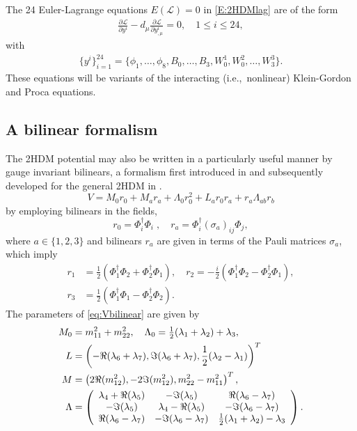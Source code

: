 \documentclass[a4paper,hidelinks, 12pt]{article}
\numberwithin{equation}{section}
\theoremstyle{plain}
\newcommand{\nn}{\nonumber}
\newcommand{\mc}{\mathcal}
\begin{document}
The 24 Euler-Lagrange equations $E(\mc{L})=0$ in \eqref{E:2HDMlag}
are of the form
\begin{align}\label{E:EL2HDM}
	\frac{\partial \mc{L}}{\partial y^i}-d_\mu \frac{\partial \mc{L}}{\partial y^i_{,\mu}}=0, \quad 1\leq i \leq 24,
\end{align}
with 
\begin{align}\label{E:24fields}
	\{y^i\}_{i=1}^{24}=\{\phi_1,\ldots, \phi_8,B_0,\ldots,B_3, W_0^1,W_0^2,\ldots,W_3^3\}.
\end{align}
These equations will be variants of the interacting (i.e.,~nonlinear) Klein-Gordon and Proca equations.

\subsection{A bilinear formalism}
\label{sec:ABilinearFormalism}
The 2HDM potential may also be written in a particularly useful manner by gauge invariant bilinears, a formalism first introduced in \cite{Nagel:2004sw} and subsequently
developed for the general 2HDM in \cite{Maniatis:2007vn}.
\begin{equation}
\label{eq:Vbilinear}
V = M_0r_0 + M_a r_a + \Lambda_0 r_0^2 + L_a r_0r_a + r_a \Lambda_{ab} r_b
\end{equation}
by employing bilinears in the fields,
\begin{equation}\label{E:bilinears}
r_0 = \Phi_i^\dag \Phi_i \;, \quad r_a = \Phi_i^\dagger (\sigma_a)_{ij} \Phi_j,
\end{equation}
where $a \in \{1,2,3\}$ and bilinears $r_a$ are given in terms of the Pauli matrices $\sigma_a$, which imply
\begin{align}
	r_1 &= \frac{1}{2}(\Phi_1^\dag \Phi_2+ \Phi_2^\dag \Phi_1), \quad
		r_2 = -\frac{i}{2}(\Phi_1^\dag \Phi_2 - \Phi_2^\dag \Phi_1), \nn \\
			r_3 &= \frac{1}{2}(\Phi_1^\dag \Phi_1- \Phi_2^\dag \Phi_2).
\end{align}
The parameters of \eqref{eq:Vbilinear} are given by
\begin{align}
	M_0&=m_{11}^2+m_{22}^2, \quad \Lambda_0= \tfrac{1}{2}(\lambda_1+\lambda_2)+\lambda_3, \\
	L&=\left(-\Re(\lambda_6+\lambda_7), \Im(\lambda_6+\lambda_7),\frac{1}{2}(\lambda_2 -\lambda_1) \right)^T \\
 M&=\left(2\Re(m_{12}^2),-2\Im(m_{12}^2), m_{22}^2-m_{11}^2\right)^T, \\
	\Lambda &= 
	\left( \begin{array}[pos]{ccc}
	\lambda_4 +\Re(\lambda_5)	& -\Im(\lambda_5) & \Re(\lambda_6-\lambda_7) \\
	-\Im(\lambda_5)	& \lambda_4 -\Re(\lambda_5)& -\Im(\lambda_6-\lambda_7)\\
\Re(\lambda_6-\lambda_7)		& -\Im(\lambda_6-\lambda_7) & \frac{1}{2}(\lambda_1+\lambda_2)-\lambda_3
	\end{array} \right). \label{E:Lambda2HDM}
\end{align}
\end{document}
